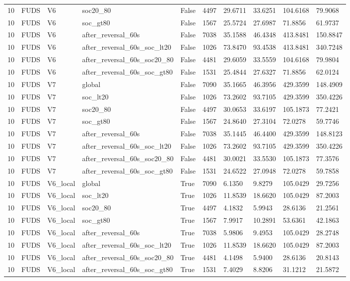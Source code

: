 \begin{tabular}{llllllllll}
10 & FUDS & V6 & soc20\_80 & False & 4497 & 29.6711 & 33.6251 & 104.6168 & 79.9068 \\
10 & FUDS & V6 & soc\_gt80 & False & 1567 & 25.5724 & 27.6987 & 71.8856 & 61.9737 \\
10 & FUDS & V6 & after\_reversal\_60s & False & 7038 & 35.1588 & 46.4348 & 413.8481 & 150.8847 \\
10 & FUDS & V6 & after\_reversal\_60s\_soc\_lt20 & False & 1026 & 73.8470 & 93.4538 & 413.8481 & 340.7248 \\
10 & FUDS & V6 & after\_reversal\_60s\_soc20\_80 & False & 4481 & 29.6059 & 33.5559 & 104.6168 & 79.9804 \\
10 & FUDS & V6 & after\_reversal\_60s\_soc\_gt80 & False & 1531 & 25.4844 & 27.6327 & 71.8856 & 62.0124 \\
10 & FUDS & V7 & global & False & 7090 & 35.1665 & 46.3956 & 429.3599 & 148.4909 \\
10 & FUDS & V7 & soc\_lt20 & False & 1026 & 73.2602 & 93.7105 & 429.3599 & 350.4226 \\
10 & FUDS & V7 & soc20\_80 & False & 4497 & 30.0653 & 33.6197 & 105.1873 & 77.2421 \\
10 & FUDS & V7 & soc\_gt80 & False & 1567 & 24.8640 & 27.3104 & 72.0278 & 59.7746 \\
10 & FUDS & V7 & after\_reversal\_60s & False & 7038 & 35.1445 & 46.4400 & 429.3599 & 148.8123 \\
10 & FUDS & V7 & after\_reversal\_60s\_soc\_lt20 & False & 1026 & 73.2602 & 93.7105 & 429.3599 & 350.4226 \\
10 & FUDS & V7 & after\_reversal\_60s\_soc20\_80 & False & 4481 & 30.0021 & 33.5530 & 105.1873 & 77.3576 \\
10 & FUDS & V7 & after\_reversal\_60s\_soc\_gt80 & False & 1531 & 24.6522 & 27.0948 & 72.0278 & 59.7858 \\
10 & FUDS & V6\_local & global & True & 7090 & 6.1350 & 9.8279 & 105.0429 & 29.7256 \\
10 & FUDS & V6\_local & soc\_lt20 & True & 1026 & 11.8539 & 18.6620 & 105.0429 & 87.2003 \\
10 & FUDS & V6\_local & soc20\_80 & True & 4497 & 4.1832 & 5.9943 & 28.6136 & 21.2561 \\
10 & FUDS & V6\_local & soc\_gt80 & True & 1567 & 7.9917 & 10.2891 & 53.6361 & 42.1863 \\
10 & FUDS & V6\_local & after\_reversal\_60s & True & 7038 & 5.9806 & 9.4953 & 105.0429 & 28.2748 \\
10 & FUDS & V6\_local & after\_reversal\_60s\_soc\_lt20 & True & 1026 & 11.8539 & 18.6620 & 105.0429 & 87.2003 \\
10 & FUDS & V6\_local & after\_reversal\_60s\_soc20\_80 & True & 4481 & 4.1498 & 5.9400 & 28.6136 & 20.8143 \\
10 & FUDS & V6\_local & after\_reversal\_60s\_soc\_gt80 & True & 1531 & 7.4029 & 8.8206 & 31.1212 & 21.5872 \\
\hline
\end{tabular}
